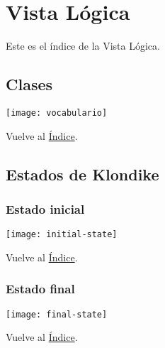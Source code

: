 \newpage
\section{Vista Lógica}
Este es el índice de la Vista Lógica.

\subsection{Clases}
\texttt{[image: vocabulario]}

Vuelve al \hyperlink{toc}{Índice}.

\newpage
\subsection{Estados de Klondike}
\subsubsection{Estado inicial}
\texttt{[image: initial-state]}

Vuelve al \hyperlink{toc}{Índice}.

\newpage
\subsubsection{Estado final}
\texttt{[image: final-state]}

Vuelve al \hyperlink{toc}{Índice}.